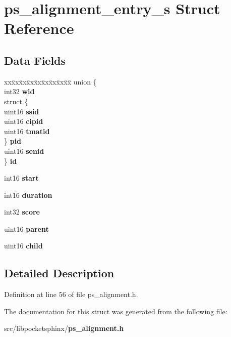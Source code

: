 \section{ps\+\_\+alignment\+\_\+entry\+\_\+s Struct Reference}
\label{structps__alignment__entry__s}
\subsection*{Data Fields}
\begin{DoxyCompactItemize}
\item 
\begin{tabbing}
xx\=xx\=xx\=xx\=xx\=xx\=xx\=xx\=xx\=\kill
union \{\\
\>int32 {\bfseries wid}\\
\>struct \{\\
\>\>uint16 {\bfseries ssid}\\
\>\>uint16 {\bfseries cipid}\\
\>\>uint16 {\bfseries tmatid}\\
\>\} {\bfseries pid}\\
\>uint16 {\bfseries senid}\\
\} {\bfseries id}\label{structps__alignment__entry__s_a3c41870e66f6813e327a29c1d9b8d3bc}
\\

\end{tabbing}\item 
int16 {\bfseries start}\label{structps__alignment__entry__s_ac3b469463845542c8d29b7c6c4e0f29e}

\item 
int16 {\bfseries duration}\label{structps__alignment__entry__s_ad5559bb3e102d94e614d6b0357bda3ad}

\item 
int32 {\bfseries score}\label{structps__alignment__entry__s_aa43ae9ba4a890fa70c07606165ea4b87}

\item 
uint16 {\bfseries parent}\label{structps__alignment__entry__s_aef8dfacf69640a3ff88514298aa8f54a}

\item 
uint16 {\bfseries child}\label{structps__alignment__entry__s_a5f8b29052c7257a83af07018dddb7eff}

\end{DoxyCompactItemize}


\subsection{Detailed Description}


Definition at line 56 of file ps\+\_\+alignment.\+h.



The documentation for this struct was generated from the following file\+:\begin{DoxyCompactItemize}
\item 
src/libpocketsphinx/{\bf ps\+\_\+alignment.\+h}\end{DoxyCompactItemize}
